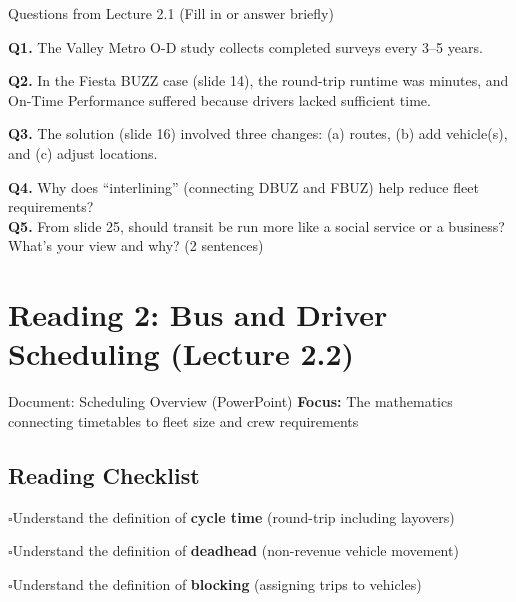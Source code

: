 \documentclass[11pt,letterpaper]{article}
\newcommand{\cmark}{$\square$\hspace{0.3em}}
\newcommand{\fillin}{\underline{\hspace{2cm}}}
\begin{document}
\begin{questionbox}{Questions from Lecture 2.1 (Fill in or answer briefly)}

\textbf{Q1.} The Valley Metro O-D study collects \fillin completed surveys every 3--5 years.
\vspace{0.2cm}

\textbf{Q2.} In the Fiesta BUZZ case (slide 14), the round-trip runtime was \fillin minutes, and On-Time Performance suffered because drivers lacked sufficient \fillin time.
\vspace{0.2cm}

\textbf{Q3.} The solution (slide 16) involved three changes: (a) \fillin routes, (b) add \fillin vehicle(s), and (c) adjust \fillin locations.
\vspace{0.2cm}

\textbf{Q4.} Why does ``interlining'' (connecting DBUZ and FBUZ) help reduce fleet requirements?\\[1cm]

\textbf{Q5.} From slide 25, should transit be run more like a social service or a business? What's your view and why? (2 sentences)\\[1.5cm]

\end{questionbox}

\section{Reading 2: Bus and Driver Scheduling (Lecture 2.2)}

\begin{readingbox}{Document: Scheduling Overview (PowerPoint)}
\textbf{Focus:} The mathematics connecting timetables to fleet size and crew requirements
\end{readingbox}

\subsection*{Reading Checklist}

\cmark Understand the definition of \textbf{cycle time} (round-trip including layovers)

\cmark Understand the definition of \textbf{deadhead} (non-revenue vehicle movement)

\cmark Understand the definition of \textbf{blocking} (assigning trips to vehicles)
\end{document}
